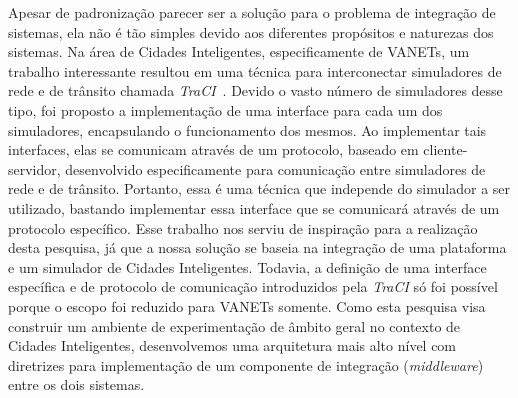 Apesar de padronização parecer ser a solução para o problema de integração de sistemas, ela não é tão simples devido aos diferentes propósitos e naturezas dos sistemas.
Na área de Cidades Inteligentes, especificamente de VANETs, um trabalho interessante resultou em uma técnica para interconectar simuladores de rede e de trânsito chamada \textit{TraCI}~\cite{wegener_2008}.
Devido o vasto número de simuladores desse tipo, foi proposto a implementação de uma interface para cada um dos simuladores, encapsulando o funcionamento dos mesmos.
Ao implementar tais interfaces, elas se comunicam através de um protocolo, baseado em cliente-servidor, desenvolvido especificamente para comunicação entre simuladores de rede e de trânsito.
Portanto, essa é uma técnica que independe do simulador a ser utilizado, bastando implementar essa interface que se comunicará através de um protocolo específico.
Esse trabalho nos serviu de inspiração para a realização desta pesquisa, já que a nossa solução se baseia na integração de uma plataforma e um simulador de Cidades Inteligentes.
Todavia, a definição de uma interface específica e de protocolo de comunicação introduzidos pela \textit{TraCI} só foi possível porque o escopo foi reduzido para VANETs somente.
Como esta pesquisa visa construir um ambiente de experimentação de âmbito geral no contexto de Cidades Inteligentes, desenvolvemos uma arquitetura mais alto nível com diretrizes para implementação de um
componente de integração (\textit{middleware}) entre os dois sistemas.
